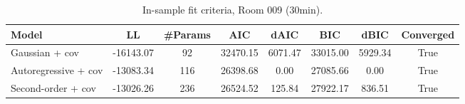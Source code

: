 \begin{table}[ht]
\centering
\begin{tabular}{lccccccc}
\hline
Model & LL & \#Params & AIC & dAIC & BIC & dBIC & Converged \\
\hline
Gaussian + cov & -16143.07 & 92 & 32470.15 & 6071.47 & 33015.00 & 5929.34 & True \\
Autoregressive + cov & -13083.34 & 116 & 26398.68 & 0.00 & 27085.66 & 0.00 & True \\
Second-order + cov & -13026.26 & 236 & 26524.52 & 125.84 & 27922.17 & 836.51 & True \\
\hline
\end{tabular}
\caption{In-sample fit criteria, Room 009 (30min).}
\label{tab:week5-fit-criteria}
\end{table}
